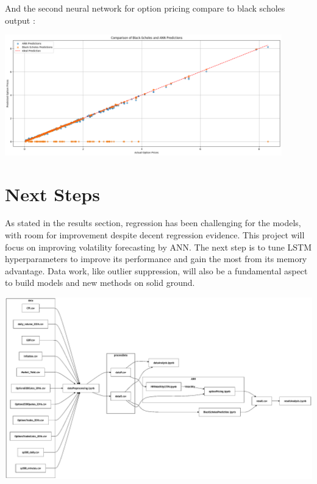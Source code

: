 \documentclass[letterpaper,11pt]{article}
\begin{document}
And the second neural network for option pricing compare to black scholes output :
\begin{center}
\includegraphics[width=0.9\textwidth]{img/BS_VS_ANN.png}
\end{center}


\section{Next Steps}

As stated in the results section, regression has been challenging for the models, with room for improvement despite decent regression evidence. This project will focus on improving volatility forecasting by ANN. The next step is to tune LSTM hyperparameters to improve its performance and gain the most from its memory advantage. Data work, like outlier suppression, will also be a fundamental aspect to build models and new methods on solid ground.



\begin{center}
\includegraphics[width=1\textwidth]{img/structure_bw.png}
\end{center}
\end{document}
